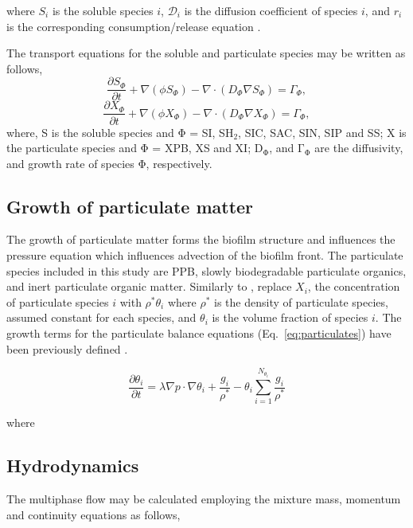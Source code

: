 where $S_i$ is the soluble species $i$, $\mathcal{D}_i$ is the diffusion coefficient of species $i$, and $r_i$ is the corresponding consumption/release equation \cite{puyol2017}.

The transport equations for the soluble and particulate species may be written as follows,
\begin{equation}
\label{eq:solublesD}
\frac{\partial S_{\Phi}}{\partial t} + \nabla (\phi S_{\Phi}) - \nabla \cdot (D_{\Phi} \nabla S_{\Phi}) = \Gamma_{\Phi}, 
\end{equation}
\begin{equation}
\label{eq:particulate}
\frac{\partial X_{\Phi}}{\partial t} + \nabla (\phi X_{\Phi}) - \nabla \cdot (D_{\Phi} \nabla X_{\Phi}) = \Gamma_{\Phi}, 
\end{equation}
where, S is the soluble species and $\mathrm{\Phi}$ = SI, SH$\mathrm{_2}$, SIC, SAC, SIN, SIP and SS; X is the particulate species and $\mathrm{\Phi}$ = XPB, XS and XI; $\mathrm{D_{\Phi}}$, and $\mathrm{\Gamma_{\Phi}}$ are the diffusivity, and growth rate of species $\mathrm{\Phi}$, respectively.  


\subsection{Growth of particulate matter}
The growth of particulate matter forms the biofilm structure and influences the pressure equation which influences advection of the biofilm front. The particulate species included in this study are PPB, slowly biodegradable particulate organics, and inert particulate organic matter. Similarly to \cite{alpkvist2007}, replace $X_i$, the concentration of particulate species $i$ with $\rho^*\theta_i$ where $\rho^*$ is the density of particulate species, assumed constant for each species, and $\theta_i$ is the volume fraction of species $i$. The growth terms for the particulate balance equations (Eq.~\ref{eq:particulates}) have been previously defined \cite{puyol2017}.


\begin{equation}
    \label{eq:particulates}
    \frac{\partial \theta_i}{\partial t} = \lambda \nabla p \cdot \nabla \theta_i + \frac{g_i}{\rho^*} - \theta_i \sum_{i=1}^{N_{\theta_i}}\frac{g_i}{\rho^*}
\end{equation}

where 

\subsection{Hydrodynamics}
\label{Hydro}
The multiphase flow may be calculated employing the mixture mass, momentum and continuity equations as follows,


